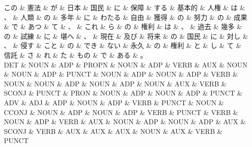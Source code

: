 \documentclass[tikz,border=5pt]{standalone}
\begin{document}
\fontsize{5pt}{6pt}\selectfont
\begin{dependency}[edge unit distance=6.1pt]
    \begin{deptext}[column sep=0.3em]
        この \& 憲法 \& が \& 日本 \& 国民 \& に \& 保障 \& する \& 基本的 \& 人権 \& は \& 、 \& 人類 \& の \& 多年 \& に \& わたる \& 自由 \& 獲得 \& の \& 努力 \& の \& 成果 \& で \& あつ \& て \& 、 \& これ \& ら \& の \& 権利 \& は \& 、 \& 過去 \& 幾多 \& の \& 試練 \& に \& 堪へ \& 、 \& 現在 \& 及び \& 将来 \& の \& 国民 \& に \& 対し \& 、 \& 侵す \& こと \& の \& でき \& ない \& 永久 \& の \& 権利 \& と \& し \& て \& 信託 \& さ \& れ \& た \& もの \& で \& ある \& 。\\
        DET \& NOUN \& ADP \& PROPN \& NOUN \& ADP \& VERB \& AUX \& NOUN \& NOUN \& ADP \& PUNCT \& NOUN \& ADP \& NOUN \& ADP \& VERB \& NOUN \& NOUN \& ADP \& NOUN \& ADP \& NOUN \& AUX \& VERB \& SCONJ \& PUNCT \& PRON \& NOUN \& ADP \& NOUN \& ADP \& PUNCT \& ADV \& ADJ \& ADP \& NOUN \& ADP \& VERB \& PUNCT \& NOUN \& CCONJ \& NOUN \& ADP \& NOUN \& ADP \& VERB \& PUNCT \& VERB \& NOUN \& ADP \& VERB \& AUX \& NOUN \& ADP \& NOUN \& ADP \& AUX \& SCONJ \& VERB \& AUX \& AUX \& AUX \& NOUN \& AUX \& VERB \& PUNCT\\
    \end{deptext}
\end{dependency}
\end{document}
